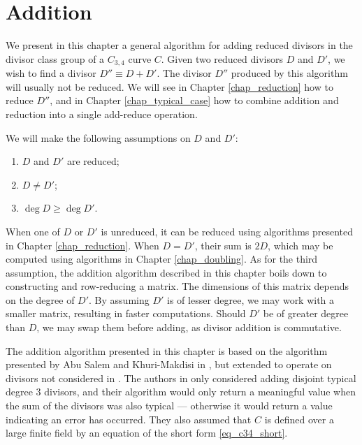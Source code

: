 
\section{Addition}
\label{chap_addition}

We present in this chapter a general algorithm for adding reduced divisors
in the divisor class group of a $C_{3,4}$ curve $C$.
Given two reduced divisors $D$ and $D'$, we wish to find a divisor $D'' \equiv D + D'$.
The divisor $D''$ produced by this algorithm will usually not be reduced.
We will see in Chapter \ref{chap_reduction} how to reduce $D''$,
and in Chapter \ref{chap_typical_case} how to combine addition and reduction into a single add-reduce operation.

We will make the following assumptions on $D$ and $D'$:
\begin{enumerate}[label=(\roman*)]
  \item $D$ and $D'$ are reduced;
  \item $D \neq D'$;
  \item $\deg D \geq \deg D'$.
\end{enumerate}
When one of $D$ or $D'$ is unreduced, it can be reduced using algorithms presented in Chapter \ref{chap_reduction}.
When $D = D'$, their sum is $2D$, which may be computed using algorithms in Chapter \ref{chap_doubling}.
As for the third assumption,
the addition algorithm described in this chapter boils down to constructing and row-reducing a matrix.
The dimensions of this matrix depends on the degree of $D'$.
By assuming $D'$ is of lesser degree, we may work with a smaller matrix, resulting in faster computations.
Should $D'$ be of greater degree than $D$, we may swap them before adding, as divisor addition is commutative.

The addition algorithm presented in this chapter
is based on the algorithm presented by Abu Salem and Khuri-Makdisi in \cite{salem07},
but extended to operate on divisors not considered in \cite{salem07}.
The authors in \cite{salem07} only considered adding disjoint typical degree 3 divisors,
and their algorithm would only return a meaningful value
when the sum of the divisors was also typical ---
otherwise it would return a value indicating an error has occurred.
They also assumed that $C$ is defined over a large finite field
by an equation of the short form \ref{eq_c34_short}.

